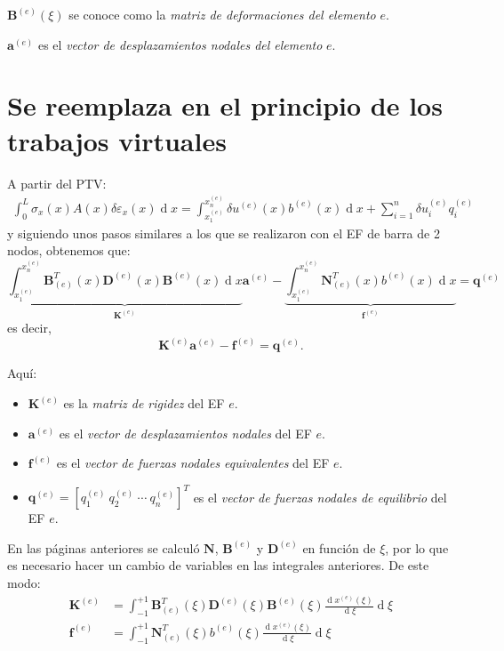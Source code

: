 \documentclass[12pt,letterpaper]{article}
\newcommand{\ve}[1]{{\boldsymbol{#1}}}
\newcommand{\ma}[1]{{\boldsymbol{#1}}}
\newcommand{\dd}{\operatorname{d} \!}
\begin{document}
$\ma{B}^{(e)}(\xi)$ se conoce como la \emph{matriz de deformaciones del elemento} $e$.

$\ve{a}^{(e)}$ es el \emph{vector de desplazamientos nodales del elemento} $e$.

\newpage
\section{Se reemplaza en el principio de los trabajos virtuales}

A partir del PTV:
\begin{align}
\int_0^L \sigma_x(x) A(x) \delta \varepsilon_x(x) \dd x = \int_{x_1^{(e)}}^{x_n^{(e)}} \delta u^{(e)}(x) b^{(e)}(x) \dd x + \sum_{i=1}^n \delta u_i^{(e)} q_i^{(e)}
\end{align}
y siguiendo unos pasos similares a los que se realizaron con el EF de barra de 2 nodos, obtenemos que:
\begin{equation}
\underbrace{\int_{x_1^{(e)}}^{x_n^{(e)}} \ma{B}_{(e)}^T(x) \ma{D}^{(e)}(x) \ma{B}^{(e)}(x) \dd x}_{\ma{K}^{(e)}} \ve{a}^{(e)} 
- \underbrace{\int_{x_1^{(e)}}^{x_n^{(e)}}  \ma{N}_{(e)}^T(x) b^{(e)}(x) \dd x}_{\ma{f}^{(e)}} 
= \ma{q}^{(e)}
\end{equation}
es decir,
\begin{equation}
\ma{K}^{(e)} \ve{a}^{(e)} - \ma{f}^{(e)} = \ma{q}^{(e)}.
\end{equation}

Aquí:
\begin{itemize}
    \item $\ma{K}^{(e)}$ es la \emph{matriz de rigidez} del EF $e$.
    \item $\ve{a}^{(e)}$ es el \emph{vector de desplazamientos nodales} del EF $e$.
    \item $\ma{f}^{(e)}$ es el \emph{vector de fuerzas nodales equivalentes} del EF $e$.    
    \item $\ve{q}^{(e)} = [q_1^{(e)}\ q_2^{(e)}\ \cdots \ q_n^{(e)}]^T$ es el \emph{vector de fuerzas nodales de equilibrio} del EF $e$.
\end{itemize}

En las páginas anteriores se calculó $\ma{N}$, $\ma{B}^{(e)}$ y $\ma{D}^{(e)}$ en función de $\xi$, por lo que es necesario hacer un cambio de variables en las integrales anteriores. De este modo:
\begin{align}
\ma{K}^{(e)} &= \int_{-1}^{+1} \ma{B}_{(e)}^T(\xi) \ma{D}^{(e)}(\xi) \ma{B}^{(e)}(\xi) \frac{\dd x^{(e)}(\xi)}{\dd \xi} \dd \xi\\
\ma{f}^{(e)} &= \int_{-1}^{+1}  \ma{N}_{(e)}^T(\xi) b^{(e)}(\xi) \frac{\dd x^{(e)}(\xi)}{\dd \xi} \dd \xi
\end{align}
\end{document}
